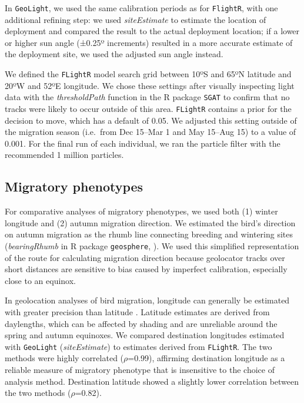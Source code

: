 \documentclass[a4paper, twoside]{templates/ociamthesis}
\begin{document}
In \texttt{GeoLight}, we used the same calibration periods as for \texttt{FlightR}, with one additional refining step: we used \emph{siteEstimate} to estimate the location of deployment and compared the result to the actual deployment location; if a lower or higher sun angle (±0.25º increments) resulted in a more accurate estimate of the deployment site, we used the adjusted sun angle instead.

We defined the \texttt{FLightR} model search grid between 10ºS and 65ºN latitude and 20ºW and 52ºE longitude. We chose these settings after visually inspecting light data with the \emph{thresholdPath} function in the R package \texttt{SGAT} \autocite{lisovskiGeoLightProcessingAnalysing2012,sumnerBayesianEstimationAnimal2009} to confirm that no tracks were likely to occur outside of this area.
\texttt{FLightR} contains a prior for the decision to move, which has a default of 0.05. We adjusted this setting outside of the migration season (i.e.~from Dec 15--Mar 1 and May 15--Aug 15) to a value of 0.001. For the final run of each individual, we ran the particle filter with the recommended 1 million particles.

\hypertarget{migratory-phenotypes}{%
\subsection{Migratory phenotypes}\label{migratory-phenotypes}}

For comparative analyses of migratory phenotypes, we used both (1) winter longitude and (2) autumn migration direction. We estimated the bird's direction on autumn migration as the rhumb line connecting breeding and wintering sites (\emph{bearingRhumb} in R package \texttt{geosphere}, \autocite{hijmansGeosphereSphericalTrigonometry2017}). We used this simplified representation of the route for calculating migration direction because geolocator tracks over short distances are sensitive to bias caused by imperfect calibration, especially close to an equinox.

In geolocation analyses of bird migration, longitude can generally be estimated with greater precision than latitude \autocite{lisovskiGeolocationLightAccuracy2012a,ekstromAdvanceGeolocationLight2004,fudickarTrackingMigratorySongbirds2012}. Latitude estimates are derived from daylengths, which can be affected by shading and are unreliable around the spring and autumn equinoxes. We compared destination longitudes estimated with \texttt{GeoLight} (\emph{siteEstimate}) to estimates derived from \texttt{FLightR}. The two methods were highly correlated (\(\rho\)=0.99), affirming destination longitude as a reliable measure of migratory phenotype that is insensitive to the choice of analysis method. Destination latitude showed a slightly lower correlation between the two methods (\(\rho\)=0.82).
\end{document}
